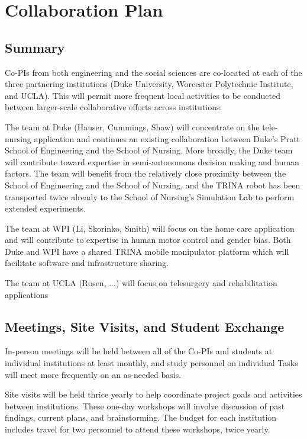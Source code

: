 \pagebreak
\setcounter{page}{1}
\setcounter{section}{0}

\section{Collaboration Plan}

\subsection{Summary}

Co-PIs from both engineering and the social sciences are co-located at each of the three partnering institutions (Duke University, Worcester Polytechnic Institute, and UCLA).  This will permit more frequent local activities to be conducted between larger-scale collaborative efforts across institutions.

The team at Duke (Hauser, Cummings, Shaw) will concentrate on the tele-nursing application and continues an existing collaboration between Duke’s Pratt School of Engineering and the School of Nursing. More broadly, the Duke team will contribute toward expertise in semi-autonomous decision making and human factors. The team will benefit from the relatively close proximity between the School of Engineering and the School of Nursing, and the TRINA robot has been transported twice already to the School of Nursing’s Simulation Lab to perform extended experiments.

The team at WPI (Li, Skorinko, Smith) will focus on the home care application and will contribute to expertise in human motor control and gender bias.  Both Duke and WPI have a shared TRINA mobile manipulator platform which will facilitate software and infrastructure sharing.

The team at UCLA (Rosen, ...) will focus on telesurgery and rehabilitation applications

\subsection{Meetings, Site Visits, and Student Exchange}

In-person meetings will be held between all of the Co-PIs and students at individual institutions at least monthly, and study personnel on individual Tasks will meet more frequently on an as-needed basis. 

Site visits will be held thrice yearly to help coordinate project goals and activities between institutions. These one-day workshops will involve discussion of past findings, current plans, and brainstorming. The budget for each institution includes travel for two personnel to attend these workshops, twice yearly. 

